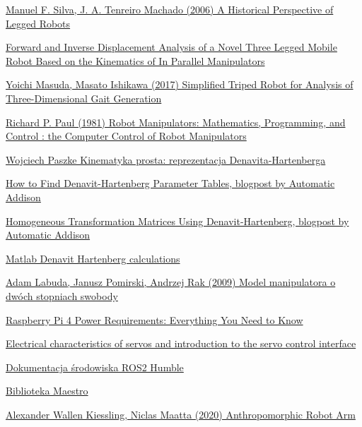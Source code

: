 \documentclass[a4paper,13pt]{article}
\begin{document}
\begin{thebibliography}{9}

\href{https://www.researchgate.net/publication/258995388_A_Historical_Perspective_of_Legged_Robots}{Manuel F. Silva, J. A. Tenreiro Machado (2006) A Historical Perspective of Legged Robots}

\href{http://www.romela.org/wp-content/uploads/2015/05/Forward-and-Inverse-Displacement-Analysis-of-a-Novel-Three-Legged-Mobile-Robot-Based-on-the-Kinematics-of-In-Parallel-Manipulators.pdf}{Forward and Inverse Displacement Analysis of a Novel Three Legged Mobile Robot Based on the Kinematics of In Parallel Manipulators}

\href{https://www.jstage.jst.go.jp/article/jrobomech/29/3/29_528/_pdf}{Yoichi Masuda, Masato Ishikawa (2017) Simplified Triped Robot for Analysis of Three-Dimensional Gait Generation}

\href{https://books.google.pl/books?id=UzZ3LAYqvRkC&redir_esc=y}{Richard P. Paul (1981) Robot Manipulators: Mathematics, Programming, and Control : the Computer Control of Robot Manipulators}

\href{http://staff.uz.zgora.pl/wpaszke/materialy/air/PRwyklad_4.pdf}{Wojciech Paszke Kinematyka prosta: reprezentacja Denavita-Hartenberga}

\href{https://automaticaddison.com/how-to-find-denavit-hartenberg-parameter-tables/}{How to Find Denavit-Hartenberg Parameter Tables, blogpost by Automatic Addison}

\href{https://automaticaddison.com/homogeneous-transformation-matrices-using-denavit-hartenberg/}{Homogeneous Transformation Matrices Using Denavit-Hartenberg, blogpost by Automatic Addison}

\href{./DH_calculations.m}{Matlab Denavit Hartenberg calculations}

\href{https://sj.umg.edu.pl/sites/default/files/ZN20.pdf}{Adam Labuda, Janusz Pomirski, Andrzej Rak (2009) Model manipulatora o dwóch stopniach swobody}

\href{https://raspberryexpert.com/raspberry-pi-4-power-requirements/}{Raspberry Pi 4 Power Requirements: Everything You Need to Know}

\href{https://www.pololu.com/blog/16/electrical-characteristics-of-servos-and-introduction-to-the-servo-control-interface}{Electrical characteristics of servos and introduction to the servo control interface}

\href{https://docs.ros.org/en/humble/index.html}{Dokumentacja środowiska ROS2 Humble}

\href{https://github.com/FRC4564/Maestro/blob/master/maestro.py}{Biblioteka Maestro}


\bibitem{}
\href{https://www.diva-portal.org/smash/get/diva2:1462059/FULLTEXT01.pdf}{Alexander Wallen Kiessling, Niclas Maatta (2020) Anthropomorphic Robot Arm}

\end{thebibliography}
\end{document}
